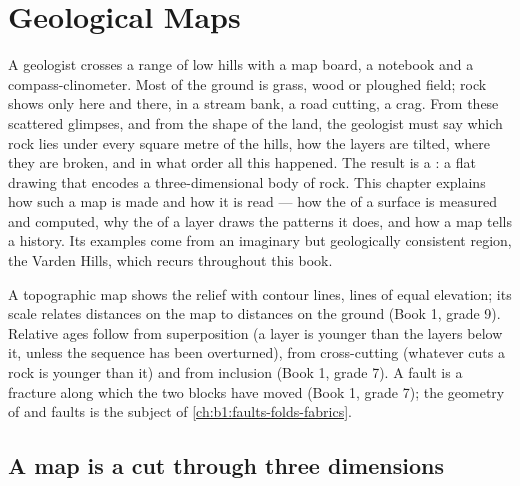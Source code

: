 \chapter{Geological Maps}\label{ch:b1:geological-maps}

A geologist crosses a range of low hills with a map board, a notebook and a
compass-clinometer. Most of the ground is grass, wood or ploughed field; rock
shows only here and there, in a stream bank, a road cutting, a crag. From these
scattered glimpses, and from the shape of the land, the geologist must say which rock
lies under every square metre of the hills, how the layers are tilted, where
they are broken, and in what order all this happened. The result is a
: a flat drawing that encodes a three-dimensional body of rock.
This chapter explains how such a map is made and how it is read --- how the
 of a surface is measured and computed, why the  of a layer
draws the patterns it does, and how a map tells a history. Its examples come
from an imaginary but geologically consistent region, the Varden Hills, which
recurs throughout this book.

\begin{recall}
A topographic map shows the relief with contour lines, lines of equal
elevation; its scale relates distances on the map to distances on the ground
(Book 1, grade 9). Relative ages follow from superposition (a layer is
younger than the layers below it, unless the sequence has been overturned),
from cross-cutting (whatever cuts a rock is younger than it) and from
inclusion (Book 1, grade 7). A fault is a fracture along which the two blocks
have moved (Book 1, grade 7); the geometry of  and faults is the subject
of \cref{ch:b1:faults-folds-fabrics}.
\end{recall}

\section{A map is a cut through three dimensions}\label{sec:b1:geological-maps:cut}

